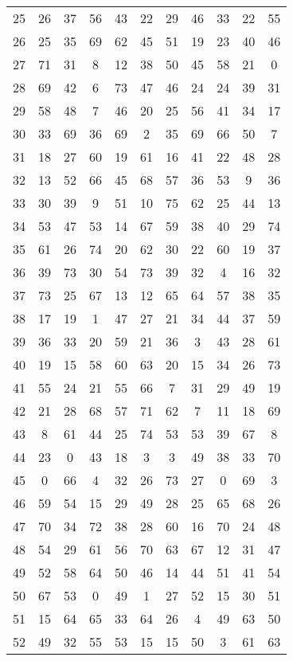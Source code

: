 \begin{table}
\begin{tabular}{c c c c c c c c c c c }
25 & 26 & 37 & 56 & 43 & 22 & 29 & 46 & 33 & 22 & 55 \\
26 & 25 & 35 & 69 & 62 & 45 & 51 & 19 & 23 & 40 & 46 \\
27 & 71 & 31 & 8 & 12 & 38 & 50 & 45 & 58 & 21 & 0 \\
28 & 69 & 42 & 6 & 73 & 47 & 46 & 24 & 24 & 39 & 31 \\
29 & 58 & 48 & 7 & 46 & 20 & 25 & 56 & 41 & 34 & 17 \\
30 & 33 & 69 & 36 & 69 & 2 & 35 & 69 & 66 & 50 & 7 \\
31 & 18 & 27 & 60 & 19 & 61 & 16 & 41 & 22 & 48 & 28 \\
32 & 13 & 52 & 66 & 45 & 68 & 57 & 36 & 53 & 9 & 36 \\
33 & 30 & 39 & 9 & 51 & 10 & 75 & 62 & 25 & 44 & 13 \\
34 & 53 & 47 & 53 & 14 & 67 & 59 & 38 & 40 & 29 & 74 \\
35 & 61 & 26 & 74 & 20 & 62 & 30 & 22 & 60 & 19 & 37 \\
36 & 39 & 73 & 30 & 54 & 73 & 39 & 32 & 4 & 16 & 32 \\
37 & 73 & 25 & 67 & 13 & 12 & 65 & 64 & 57 & 38 & 35 \\
38 & 17 & 19 & 1 & 47 & 27 & 21 & 34 & 44 & 37 & 59 \\
39 & 36 & 33 & 20 & 59 & 21 & 36 & 3 & 43 & 28 & 61 \\
40 & 19 & 15 & 58 & 60 & 63 & 20 & 15 & 34 & 26 & 73 \\
41 & 55 & 24 & 21 & 55 & 66 & 7 & 31 & 29 & 49 & 19 \\
42 & 21 & 28 & 68 & 57 & 71 & 62 & 7 & 11 & 18 & 69 \\
43 & 8 & 61 & 44 & 25 & 74 & 53 & 53 & 39 & 67 & 8 \\
44 & 23 & 0 & 43 & 18 & 3 & 3 & 49 & 38 & 33 & 70 \\
45 & 0 & 66 & 4 & 32 & 26 & 73 & 27 & 0 & 69 & 3 \\
46 & 59 & 54 & 15 & 29 & 49 & 28 & 25 & 65 & 68 & 26 \\
47 & 70 & 34 & 72 & 38 & 28 & 60 & 16 & 70 & 24 & 48 \\
48 & 54 & 29 & 61 & 56 & 70 & 63 & 67 & 12 & 31 & 47 \\
49 & 52 & 58 & 64 & 50 & 46 & 14 & 44 & 51 & 41 & 54 \\
50 & 67 & 53 & 0 & 49 & 1 & 27 & 52 & 15 & 30 & 51 \\
51 & 15 & 64 & 65 & 33 & 64 & 26 & 4 & 49 & 63 & 50 \\
52 & 49 & 32 & 55 & 53 & 15 & 15 & 50 & 3 & 61 & 63 \\

\end{tabular}
\end{table}
